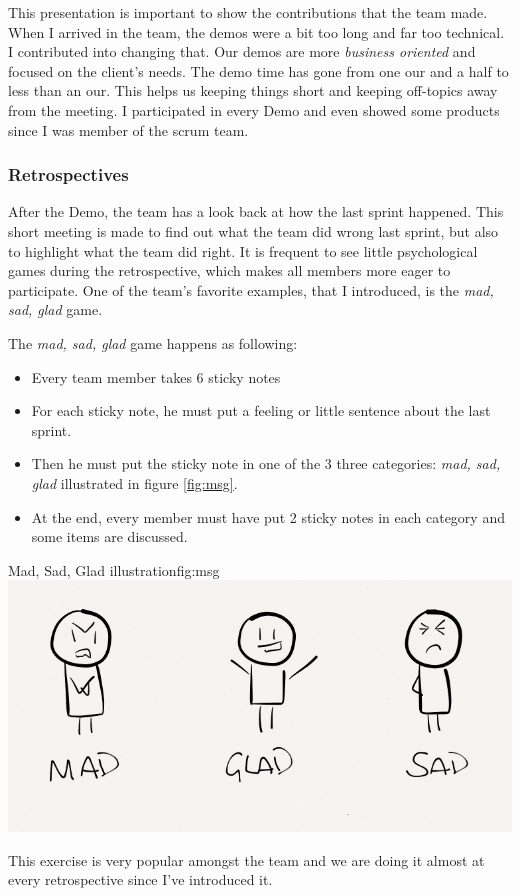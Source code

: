 This presentation is important to show the contributions that the team made. When I arrived in the team, the
demos were a bit too long and far too technical. I contributed into changing that. Our demos are more
\emph{business oriented} and focused on the client's needs. The demo time has gone from one our and a half to less than an our.
This helps us keeping things short and keeping off-topics away from the meeting.
I participated in every Demo and even showed some products since I was member of the \gls{scrum} team.

\subsubsection{Retrospectives}
After the Demo, the team has a look back at how the last sprint happened. This short meeting is made
to find out what the team did wrong last sprint, but also to highlight what the team did right.
It is frequent to see little psychological games during the retrospective, which makes all members more
eager to participate. One of the team's favorite examples, that I introduced, is the \emph{mad, sad, glad} game.

The \emph{mad, sad, glad} game happens as following:
\begin{itemize}
    \item Every team member takes 6 sticky notes
    \item For each sticky note, he must put a feeling or little sentence about
        the last sprint.
    \item Then he must put the sticky note in one of the 3 three categories: \emph{mad, sad, glad} illustrated in
        figure \ref{fig:msg}.
    \item At the end, every member must have put 2 sticky notes in each category and some items are discussed.
\end{itemize}

\begin{figureGraphics}{Mad, Sad, Glad illustration}{fig:msg}
    \includegraphics[height=0.2\textheight]{./src/img/mgs.png}
\end{figureGraphics}
This exercise is very popular amongst the team and we are doing it almost at every retrospective since I've introduced it.
